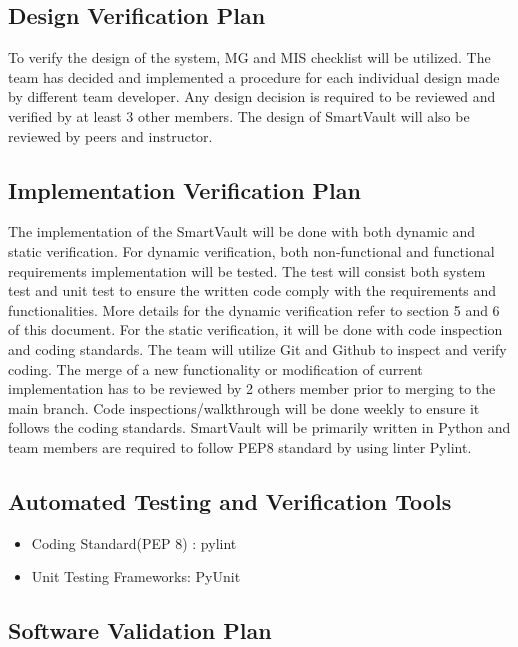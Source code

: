 \documentclass[12pt, titlepage]{article}
\begin{document}
\subsection{Design Verification Plan}

To verify the design of the system, MG and MIS checklist will be utilized. The team has decided and implemented a procedure for each individual design made by different team developer. Any design decision is required to be reviewed and verified by at least 3 other members. The design of SmartVault will also be reviewed by peers and instructor. 

\subsection{Implementation Verification Plan}

The implementation of the SmartVault will be done with both dynamic and static verification. For dynamic verification, both non-functional and functional requirements implementation will be tested. The test will consist both system test and unit test to ensure the written code comply with the requirements and functionalities. More details for the dynamic verification refer to section 5 and 6 of this document. For the static verification, it will be done with code inspection and coding standards. The team will utilize  Git and Github to inspect and verify coding. The merge of a new functionality or modification of current implementation has to be reviewed by 2 others member prior to merging to the main branch. Code inspections/walkthrough will be done weekly to ensure it follows the coding standards. SmartVault will be primarily written in Python and team members are required to follow PEP8 standard by using linter Pylint.
\subsection{Automated Testing and Verification Tools}

\begin{itemize}
    \item Coding Standard(PEP 8) : pylint
    \item Unit Testing Frameworks: PyUnit
   
   
\end{itemize}

\subsection{Software Validation Plan}
\end{document}
